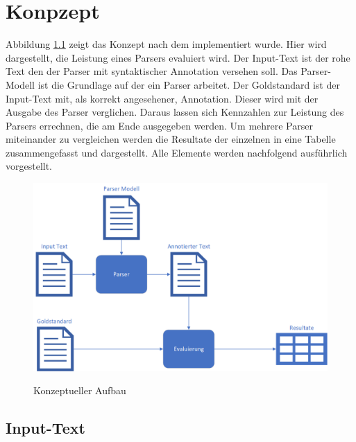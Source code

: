 %
\chapter{Konpzept}
\label{sec:konzept}
Abbildung \ref{fig:konzept-aufbau} zeigt das Konzept nach dem implementiert wurde. Hier wird dargestellt, die Leistung eines Parsers evaluiert wird. Der Input-Text ist der rohe Text den der Parser mit syntaktischer Annotation versehen soll. Das Parser-Modell ist die Grundlage auf der ein Parser arbeitet. Der Goldstandard ist der Input-Text mit, als korrekt angesehener, Annotation. Dieser wird mit der Ausgabe des Parser verglichen. Daraus lassen sich Kennzahlen zur Leistung des Parsers errechnen, die am Ende ausgegeben werden.
Um mehrere Parser miteinander zu vergleichen werden die Resultate der einzelnen in eine Tabelle zusammengefasst und dargestellt. Alle Elemente werden nachfolgend ausführlich vorgestellt. 
\begin{figure} [h]

\includegraphics[width=\textwidth]{gfx/konzept-aufbau-png.png} 
\label{fig:konzept-aufbau}	
\caption{Konzeptueller Aufbau}	
\end{figure}
		
\section{Input-Text}



